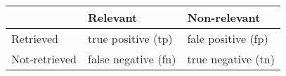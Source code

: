 
{
\sffamily


\begin{tabular}{ | l | l | l | }
    \hline
     & Relevant & Non-relevant  \\ \hline
   Retrieved & true positive (tp) & fale positive (fp) \\ \hline
    Not-retrieved & false negative (fn) & true negative (tn) \\ \hline
       
\end{tabular}
}
